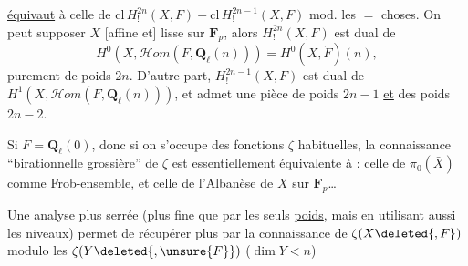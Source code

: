 \uline{équivaut} à celle de
$\mathrm{cl}\,H^{2n}_!(X,F)-\mathrm{cl}\,H^{2n-1}_!(X,F)$
mod. les $=$ choses. On peut supposer $X$
[affine et] lisse sur $\mathbf F_p$,  alors $H^{2n}_!(X,F)$
est dual de
\[
H^0(X,\mathcal Hom(F,\mathbf Q_\ell(n)))=H^0(X,\check F)(n),
\]
 purement de poids $2n$. D'autre part, $H^{2n-1}_!(X,F)$
est dual de $H^1(X,\mathcal Hom(F,\mathbf Q_\ell(n)))$, et admet
une pièce de poids $2n-1$ \uline{et} des poids $2n-2$.

Si $F=\mathbf Q_\ell(0)$,  donc
 si on s'occupe des fonctions $\zeta$
habituelles, la connaissance ``birationnelle
grossière'' de $\zeta$ est essentiellement équivalente à :
celle de $\pi_0(\bar X)$ comme Frob-ensemble,
et celle de l'Albanèse de $X$ sur $\mathbf F_p$\ldots
{}

Une analyse plus serrée  (plus
fine que par les seuls \uline{poids}, mais en
utilisant aussi les niveaux) permet de
récupérer plus par la connaissance de
$\zeta(X\deleted{,F})$  modulo les
$\zeta(Y\deleted{,\unsure{F}})$ ($\dim Y<n$)
